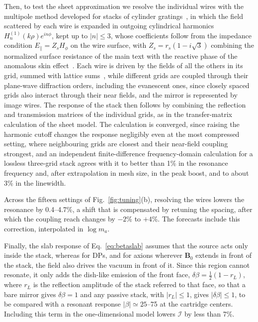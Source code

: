 \documentclass[
  aps,prl,reprint,superscriptaddress,
  amsmath,amssymb,floatfix,nofootinbib
]{revtex4-2}
\begin{document}
Then, to test the sheet approximation we resolve the individual wires with the multipole method developed for stacks of cylinder gratings~\cite{Nicorovici:1995,Botten:2000}, in which the field scattered by each wire is expanded in outgoing cylindrical harmonics $H_n^{(1)}(k\rho)e^{in\phi}$, kept up to $|n|\le3$, whose coefficients follow from the impedance condition $E_\parallel=Z_sH_\phi$ on the wire surface, with $Z_s=r_s(1-i\sqrt3)$ combining the normalized surface resistance of the main text with the reactive phase of the anomalous skin effect~\cite{ReuterSondheimer:1948}. Each wire is driven by the fields of all the others in its grid, summed with lattice sums~\cite{Linton:1998}, while different grids are coupled through their plane-wave diffraction orders, including the evanescent ones, since closely spaced grids also interact through their near fields, and the mirror is represented by image wires. The response of the stack then follows by combining the reflection and transmission matrices of the individual grids, as in the transfer-matrix calculation of the sheet model. The calculation is converged, since raising the harmonic cutoff changes the response negligibly even at the most compressed setting, where neighbouring grids are closest and their near-field coupling strongest, and an independent finite-difference frequency-domain calculation for a lossless three-grid stack agrees with it to better than 1\% in the resonance frequency and, after extrapolation in mesh size, in the peak boost, and to about 3\% in the linewidth.

Across the fifteen settings of Fig.~\ref{fig:tuning}(b), resolving the wires lowers the resonance by 0.4--4.7\%, a shift that is compensated by retuning the spacing, after which the coupling reach changes by $-2\%$ to $+4\%$. The forecasts include this correction, interpolated in $\log m_a$.

Finally, the slab response of Eq.~\eqref{eq:betaslab} assumes that the source acts only inside the stack, whereas for DPs, and for axions wherever $\mathbf B_0$ extends in front of the stack, the field also drives the vacuum in front of it. Since this region cannot resonate, it only adds the dish-like emission of the front face, $\delta\beta=\tfrac12(1-r_L)$, where $r_L$ is the reflection amplitude of the stack referred to that face, so that a bare mirror gives $\delta\beta=1$ and any passive stack, with $|r_L|\le1$, gives $|\delta\beta|\le1$, to be compared with a resonant response $|\beta|\simeq25$--75 at the cartridge centers. Including this term in the one-dimensional model lowers $\mathcal I$ by less than 7\%.
\end{document}
